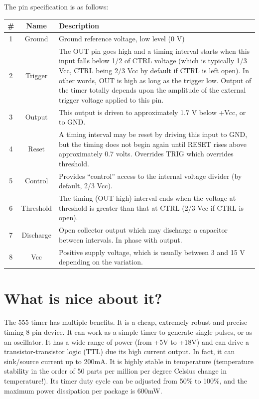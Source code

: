\documentclass[12pt]{extarticle}
\begin{document}
The pin specification is as follows:
\begin{center}
\begin{tabular}{|c|c|p{10cm}|}
\hline
\textbf{\#} & \textbf{Name} & \textbf{Description}\\
\hline
1 & Ground & Ground reference voltage, low level (0 V)\\
\hline
2 & Trigger & The OUT pin goes high and a timing interval starts when this input falls below 1/2 of CTRL voltage (which is typically 1/3 Vcc, CTRL being 2/3 Vcc by default if CTRL is left open). In other words, OUT is high as long as the trigger low. Output of the timer totally depends upon the amplitude of the external trigger voltage applied to this pin.\\
\hline
3 & Output & This output is driven to approximately 1.7 V below +Vcc, or to GND.\\
\hline
4 & Reset & A timing interval may be reset by driving this input to GND, but the timing does not begin again until RESET rises above approximately 0.7 volts. Overrides TRIG which overrides threshold.\\
\hline
5 & Control & Provides “control” access to the internal voltage divider (by default, 2/3 Vcc).\\
\hline
6 & Threshold & The timing (OUT high) interval ends when the voltage at threshold is greater than that at CTRL (2/3 Vcc if CTRL is open).\\
\hline
7 & Discharge & Open collector output which may discharge a capacitor between intervals. In phase with output.\\
\hline
8 & Vcc & Positive supply voltage, which is usually between 3 and 15 V depending on the variation.\\
\hline
\end{tabular}
\end{center}
\section{What is nice about it?}
The 555 timer has multiple benefits. It is a cheap, extremely robust and precise timing 8-pin device. It can work as a simple timer to generate single pulses, or as an oscillator. It has a wide range of power (from +5V to +18V) and can drive a transistor-transistor logic (TTL) due its high current output. In fact, it can sink/source current up to 200mA. It is highly stable in temperature (temperature stability in the order of 50 parts per million per degree Celsius change in temperature!). Its timer duty cycle can be adjusted from 50\% to 100\%, and the maximum power dissipation per package is 600mW.
\end{document}
